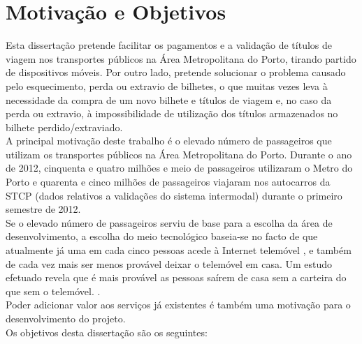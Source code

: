 \section{Motivação e Objetivos} \label{sec:goals}

Esta dissertação pretende facilitar os pagamentos e a validação de títulos de viagem nos transportes públicos na Área Metropolitana do Porto, tirando partido de dispositivos móveis. Por outro lado, pretende solucionar o problema causado pelo esquecimento, perda ou extravio de bilhetes, o que muitas vezes leva à necessidade da compra de um novo bilhete e títulos de viagem e, no caso da perda ou extravio, à impossibilidade de utilização dos títulos armazenados no bilhete perdido/extraviado.
\\A principal motivação deste trabalho é o elevado número de passageiros que utilizam os transportes públicos na Área Metropolitana do Porto. Durante o ano de 2012, cinquenta e quatro milhões e meio de passageiros utilizaram o Metro do Porto \cite{INE20130528} e quarenta e cinco milhões de passageiros viajaram nos autocarros da STCP (dados relativos a validações do sistema intermodal) durante o primeiro semestre de 2012. \cite{andante}
\\Se o elevado número de passageiros serviu de base para a escolha da área de desenvolvimento, a escolha do meio tecnológico baseia-se no facto de que atualmente já uma em cada cinco pessoas acede à Internet  telemóvel \cite{INE20121106}, e também de cada vez mais ser menos provável deixar o telemóvel em casa. Um estudo efetuado revela que é mais provável as pessoas saírem de casa sem a carteira do que sem o telemóvel. \cite{NFCForum2011}.
\\Poder adicionar valor aos serviços já existentes é também uma motivação para o desenvolvimento do projeto.
\\Os objetivos desta dissertação são os seguintes:
